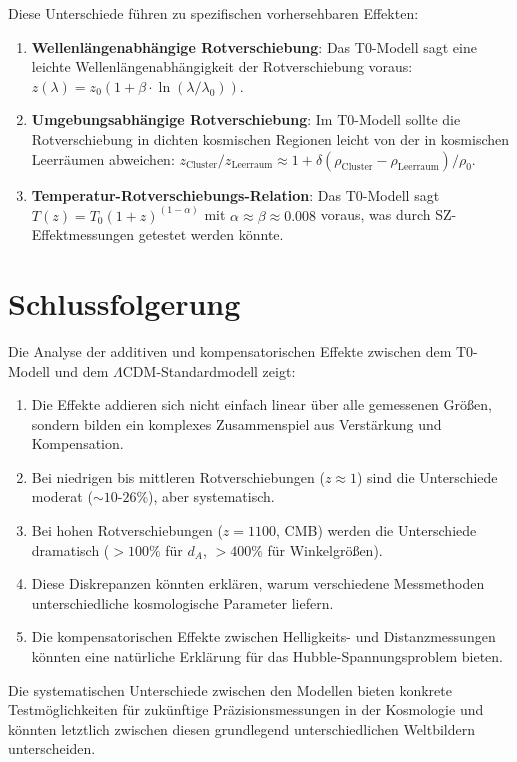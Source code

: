 \documentclass[a4paper,12pt]{article}
\theoremstyle{definition}
\theoremstyle{remark}
\begin{document}
	Diese Unterschiede führen zu spezifischen vorhersehbaren Effekten:
	
	\begin{enumerate}
		\item \textbf{Wellenlängenabhängige Rotverschiebung}: Das T0-Modell sagt eine leichte Wellenlängenabhängigkeit der Rotverschiebung voraus: $z(\lambda) = z_0(1 + \beta\cdot\ln(\lambda/\lambda_0))$.
		\item \textbf{Umgebungsabhängige Rotverschiebung}: Im T0-Modell sollte die Rotverschiebung in dichten kosmischen Regionen leicht von der in kosmischen Leerräumen abweichen: $z_\text{Cluster}/z_\text{Leerraum} \approx 1 + \delta(\rho_\text{Cluster}-\rho_\text{Leerraum})/\rho_0$.
		\item \textbf{Temperatur-Rotverschiebungs-Relation}: Das T0-Modell sagt $T(z) = T_0(1+z)^{(1-\alpha)}$ mit $\alpha \approx \beta \approx 0.008$ voraus, was durch SZ-Effektmessungen getestet werden könnte.
	\end{enumerate}
	
	\section{Schlussfolgerung}
	
	Die Analyse der additiven und kompensatorischen Effekte zwischen dem T0-Modell und dem \(\Lambda\)CDM-Standardmodell zeigt:
	
	\begin{enumerate}
		\item Die Effekte addieren sich nicht einfach linear über alle gemessenen Größen, sondern bilden ein komplexes Zusammenspiel aus Verstärkung und Kompensation.
		\item Bei niedrigen bis mittleren Rotverschiebungen ($z \approx 1$) sind die Unterschiede moderat ($\sim10$-$26\%$), aber systematisch.
		\item Bei hohen Rotverschiebungen ($z = 1100$, CMB) werden die Unterschiede dramatisch ($>100\%$ für $d_A$, $>400\%$ für Winkelgrößen).
		\item Diese Diskrepanzen könnten erklären, warum verschiedene Messmethoden unterschiedliche kosmologische Parameter liefern.
		\item Die kompensatorischen Effekte zwischen Helligkeits- und Distanzmessungen könnten eine natürliche Erklärung für das Hubble-Spannungsproblem bieten.
	\end{enumerate}
	
	Die systematischen Unterschiede zwischen den Modellen bieten konkrete Testmöglichkeiten für zukünftige Präzisionsmessungen in der Kosmologie und könnten letztlich zwischen diesen grundlegend unterschiedlichen Weltbildern unterscheiden.
	
\end{document}
